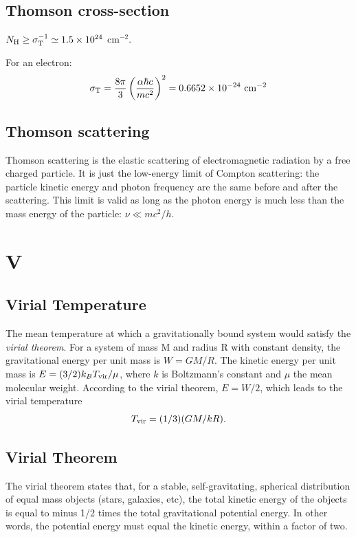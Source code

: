 \documentclass[11pt]{article}
\begin{document}
{\subsection*{Thomson cross-section}
$N_{\rm H} \geq \sigma_{\rm T}^{-1} \simeq 1.5 \times 10^{24}$ cm$^{-2}$. 

For an electron:
\begin{equation}
\sigma_{\rm T}= \frac{8\pi}{3} \left(\frac{\alpha\hbar c}{mc^2}\right)^2 = 0.6652\times10^{-24} \,\, \rm{cm}^{-2}
\end{equation}

\subsection*{Thomson scattering} 
Thomson scattering is the elastic scattering of electromagnetic
radiation by a free charged particle. It is just the low-energy limit
of Compton scattering: the particle kinetic energy and photon
frequency are the same before and after the scattering. This limit is
valid as long as the photon energy is much less than the mass energy
of the particle: $\nu\ll mc^2/h$.

\section*{V}
\subsection*{Virial Temperature}
The mean temperature at which a gravitationally bound system would
satisfy the {\it virial theorem}. For a system of mass M and radius R
with constant density, the gravitational energy per unit mass is $W =
GM/R$. The kinetic energy per unit mass is $E = (3/2) k_{B} T_{\rm
vir}/\mu$, where $k$ is Boltzmann's constant and $\mu$ the mean
molecular weight. According to the virial theorem, $E = W/2$, which
leads to the virial temperature
\begin{equation}
  T_{\rm vir}  =  (1/3) (GM/kR).
\end{equation}

\subsection*{Virial Theorem}
The virial theorem states that, for a stable, self-gravitating,
spherical distribution of equal mass objects (stars, galaxies, etc),
the total kinetic energy of the objects is equal to minus 1/2 times
the total gravitational potential energy. In other words, the
potential energy must equal the kinetic energy, within a factor of
two.

}
\end{document}
